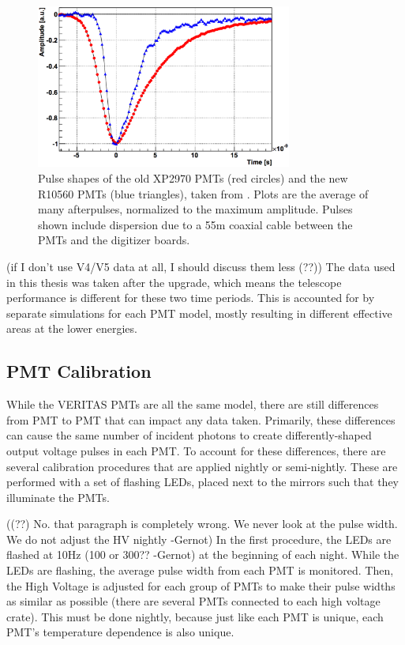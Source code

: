 \begin{figure}[ht]
  \centering
  \includegraphics[width=0.75\textwidth]{images/pmt_models_pulsewidths.eps}
  \caption[Pulse Shapes]{
    Pulse shapes of the old XP2970 PMTs (red circles) and the new R10560 PMTs (blue triangles), taken from \cite{pmtmodels}.
    Plots are the average of many afterpulses, normalized to the maximum amplitude.
    Pulses shown include dispersion due to a \nicetilde55m coaxial cable between the PMTs and the digitizer boards.}
  \label{fig:pmt_pulse_widths}
\end{figure}

{\color{red}(if I don't use V4/V5 data at all, I should discuss them less (??))}
The data used in this thesis was taken after the upgrade, which means the telescope performance is different for these two time periods.
This is accounted for by separate simulations for each PMT model, mostly resulting in different effective areas at the lower energies.


\subsection{PMT Calibration}

While the VERITAS PMTs are all the same model, there are still differences from PMT to PMT that can impact any data taken.
Primarily, these differences can cause the same number of incident photons to create differently-shaped output voltage pulses in each PMT.
To account for these differences, there are several calibration procedures that are applied nightly or semi-nightly.
These are performed with a set of flashing LEDs, placed next to the mirrors such that they illuminate the PMTs.

{\color{red}((??) No. that paragraph is completely wrong. We never look at the pulse width. We do not adjust the HV nightly -Gernot)}
In the first procedure, the LEDs are flashed at \nicetilde10Hz {\color{red}(100 or 300?? -Gernot)} at the beginning of each night.
While the LEDs are flashing, the average pulse width from each PMT is monitored.
Then, the High Voltage is adjusted for each group of PMTs to make their pulse widths as similar as possible (there are several PMTs connected to each high voltage crate).
This must be done nightly, because just like each PMT is unique, each PMT's temperature dependence is also unique.

